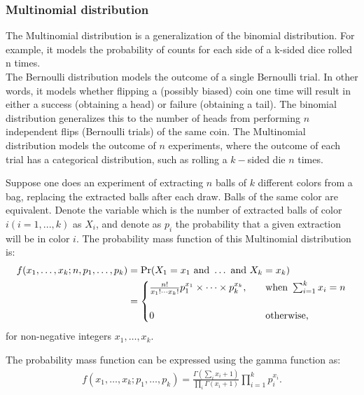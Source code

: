 				\subsubsection{Multinomial distribution}
					The Multinomial distribution is a generalization of the binomial distribution. For example, it models the probability of counts for each side of a k-sided dice rolled n times.\\
					The Bernoulli distribution models the outcome of a single Bernoulli trial. In other words, it models whether flipping a (possibly biased) coin one time will result in either a success (obtaining a head) or failure (obtaining a tail). The binomial distribution generalizes this to the number of heads from performing $n$ independent flips (Bernoulli trials) of the same coin. The Multinomial distribution models the outcome of $n$ experiments, where the outcome of each trial has a categorical distribution, such as rolling a $k-$sided die $n$ times.

					\begin{defn}
						Suppose one does an experiment of extracting $n$ balls of $k$ different colors from a bag, replacing the extracted balls after each draw. Balls of the same color are equivalent. Denote the variable which is the number of extracted balls of color $i (i = 1, ..., k)$ as $X_i$, and denote as $p_i$ the probability that a given extraction will be in color $i$. The probability mass function of this Multinomial distribution is:
							\begin{equation}
									\begin{aligned}
										f(x_{1},\ldots ,x_{k};n,p_{1},\ldots ,p_{k})
											&= \Pr(X_{1}=x_{1}{\text{ and }}\dots {\text{ and }}X_{k}=x_{k})\\
											&={
												\begin{cases}{
														{n! \over x_{1}!\cdots x_{k}!} p_{1}^{x_{1}}\times \cdots \times p_{k}^{x_{k}}},\quad &{\text{when }}\sum _{i=1}^{k}x_{i}=n\\\\
														0	& {\text{otherwise,}}
												\end{cases}
											   }
									\end{aligned}
							\end{equation}
							for non-negative integers $x_1, \ldots, x_k$. \cite{berger2001statistical}

							The probability mass function can be expressed using the gamma function as: \cite{johnson1997multivariate}
								\begin{equation}
									\begin{aligned}
										 f(x_{1},\dots ,x_{k};p_{1},\ldots ,p_{k})={\frac {\Gamma (\sum _{i}x_{i}+1)}{\prod _{i}\Gamma (x_{i}+1)}}\prod _{i=1}^{k}p_{i}^{x_{i}}.
									\end{aligned}
								\end{equation}
					\end{defn}


